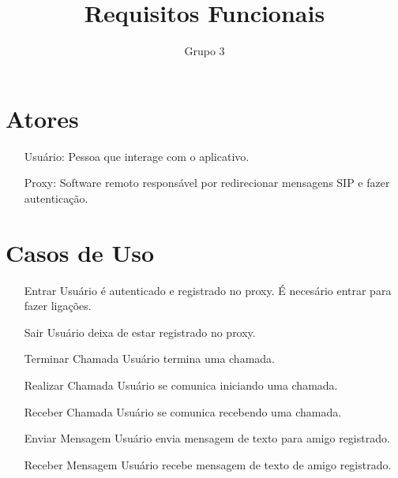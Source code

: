 \documentclass[12pt,a4paper]{article}
\author{Grupo 3}
\title{Requisitos Funcionais}
\begin{document}
\maketitle

\section{Atores}
\begin{enumerate}

\item [Usu\'{a}rio:] Pessoa que interage com o aplicativo.
\item [Proxy:] Software remoto respons\'{a}vel por redirecionar mensagens SIP e fazer autentica\c{c}\~{a}o.

\end{enumerate}

\section{Casos de Uso}
\begin{itemize}

\item [Entrar] Usu\'{a}rio \'{e} autenticado e registrado no proxy. \'{E} neces\'{a}rio entrar para fazer liga\c{c}\~{o}es.

\item [Sair] Usu\'{a}rio deixa de estar registrado no proxy.

\item [Terminar Chamada] Usu\'{a}rio termina uma chamada.

\item [Realizar Chamada] Usu\'{a}rio se comunica iniciando uma chamada.

\item [Receber Chamada] Usu\'{a}rio se comunica recebendo uma chamada.

\item [Enviar Mensagem] Usu\'{a}rio envia mensagem de texto para amigo registrado.

\item [Receber Mensagem] Usu\'{a}rio recebe mensagem de texto de amigo registrado.

\end{itemize}
\end{document}
